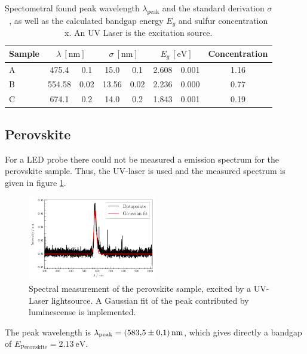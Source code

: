 \begin{table}
    \caption{Spectometral found peak wavelength $\lambda_\text{peak}$ and the standard derivation $\sigma$, as well as the calculated bandgap energy $E_g$ and sulfur concentration x. An UV Laser is the excitation source.}
    \label{tab:results-Laser}
    \centering
    \begin{tabular}{l S[table-format=3.2]@{${}\pm{}$}S[table-format=1.2] S[table-format=2.2]@{${}\pm{}$}S[table-format=1.2] S[table-format=1.3]@{${}\pm{}$}S[table-format=1.3] S[table-format=1.2]}
          \toprule
          {Sample} &  &  &  & {Concentration} \\
          \midrule
          {A} & 475.4  & 0.1   & 15.0  & 0.1   & 2.608 & 0.001 & 1.16\\
          {B} & 554.58 & 0.02  & 13.56 & 0.02  & 2.236 & 0.000 & 0.77\\
          {C} & 674.1  & 0.2   & 14.0  & 0.2   & 1.843 & 0.001 & 0.19\\
          \bottomrule
    \end{tabular}
\end{table}

\subsection{Perovskite}
\label{sec:perovsikite-measure}

For a LED probe there could not be measured a emission spectrum for the perovskite sample. Thus, the UV-laser is used and the measured spectrum is given in figure \ref{fig:perov}.
\begin{figure}
    \captionsetup{width=0.9\linewidth}
    \includegraphics[width=0.5\textwidth]{plots/Samp_P_UV.pdf}
  \caption{Spectral measurement of the perovskite sample, excited by a UV-Laser lightsource. A Gaussian fit of the peak contributed by luminescense is implemented.}
    \label{fig:perov}
\end{figure}
The peak wavelength is $\lambda_\text{peak}= \SI{583.5 \pm 0.1}{\nano\meter}$, which gives directly a bandgap of 
$E_\text{Perovskite} = \SI{2.13}{\eV}$.

